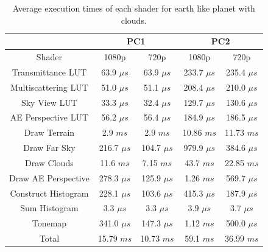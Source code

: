 \documentclass{ctuthesis}
\begin{document}
\begin{center}
\begin{table}[h]
\begin{tabular}{ ||c|c|c|c|c|| } 
\hline
& \multicolumn{2}{|c|}{PC1} & \multicolumn{2}{|c||}{PC2} \\
\hline
Shader              & 1080p          & 720p         &1080p         &  720p           \\
\hline
Transmittance LUT   & 63.9 $\mu s$   & 63.9 $\mu s$ & 233.7 $\mu s$&  235.4 $\mu s$  \\
\hline
Multiscattering LUT & 51.0 $\mu s$   & 51.1 $\mu s$ & 208.4 $\mu s$&  210.0 $\mu s$  \\
\hline
Sky View LUT        & 33.3 $\mu s$   & 32.4 $\mu s$ & 129.7 $\mu s$&  130.6 $\mu s$  \\
\hline
AE Perspective LUT  & 56.2 $\mu s$   & 56.4 $\mu s$ & 184.9 $\mu s$&  186.5 $\mu s$  \\
\hline
\hline
Draw Terrain        & 2.9 $ms$       & 2.9 $ms$     & 10.86 $ms$   &  11.73 $ms$     \\
\hline
Draw Far Sky        & 216.7 $\mu s$  & 104.7 $\mu s$& 979.9 $\mu s$&  384.6 $\mu s$  \\
\hline
Draw Clouds         & 11.6 $ms$      & 7.15 $ms$    & 43.7 $ms$    &  22.85 $ms$     \\
\hline
Draw AE Perspective & 278.3 $\mu s$  & 125.9 $\mu s$& 1.26 $ms$    &  569.7 $\mu s$  \\
\hline
\hline
Construct Histogram & 228.1 $\mu s$  & 103.6 $\mu s$& 415.3 $\mu s$&  187.9 $\mu s$  \\
\hline
Sum Histogram       & 3.3 $\mu s$    & 3.3 $\mu s$  & 3.9 $\mu s$  &  3.7 $\mu s$    \\
\hline
Tonemap             & 341.0 $\mu s$  & 147.3 $\mu s$& 1.12 $ms$    &  500.0 $\mu s$  \\
\hline
\hline
Total              & 15.79 $ms $     & 10.73 $ms$   & 59.1 $ms$    &   36.99 $ms$    \\
\hline
\end{tabular}
\caption[Earth-like planet performance]{\label{tab:Earth like performance} Average execution times of each shader
    for earth like planet with clouds.}
\end{table}
\end{center}

\pagebreak
\end{document}
